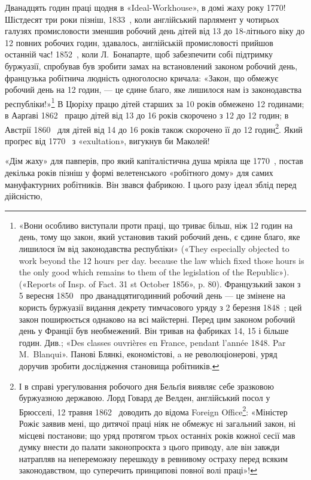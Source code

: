 Дванадцять годин праці щодня в «Ideal-Workhouse», в домі
жаху року 1770! Шістдесят три роки пізніш, 1833~, коли англійський
парлямент у чотирьох галузях промисловости зменшив
робочий день дітей від 13 до 18-літнього віку до 12 повних робочих
годин, здавалось, англійській промисловості прийшов останній
час! 1852~, коли Л.~Бонапарте, щоб забезпечити собі підтримку
буржуазії, спробував був зробити замах на встановлений
законом робочий день, французька робітнича людність одноголосно
кричала: «Закон, що обмежує робочий день на 12 годин, —
це єдине благо, яке лишилося нам із законодавства республіки!»\footnote{
«Вони особливо виступали проти праці, що триває більш, ніж
12 годин на день, тому що закон, який установив такий робочий день, є
єдине благо, яке лишилося їм від законодавства республіки» («They especially
objected to work beyond the 12 hours per day. because the law which
fixed those hours is the only good which remains to them of the legislation
of the Republic»). («Reports of Insp. of Fact. 31 st October 1856»,
p. 80). Французький закон з 5 вересня 1850~ про дванадцятигодинний
робочий день — це змінене на користь буржуазії видання декрету тимчасового
уряду з 2 березня 1848~; цей закон поширюється однаково на
всі майстерні. Перед цим законом робочий день у Франції був необмежений.
Він тривав на фабриках 14, 15 і більше годин. Див.; «Des classes
ouvrières en France, pendant l'année 1848. Par M.~Blanqui». Панові Блянкі,
економістові, a не революціонерові, уряд доручив зробити дослідження
становища робітників.
}
В Цюріху працю дітей старших за 10 років обмежено 12 годинами;
в Аарґаві 1862~ працю дітей від 13 до 16 років скорочено з 12
до 12 годин; в Австрії 1860~ для дітей від 14 до 16 років також
скорочено її до 12 годин\footnote{
І в справі урегулювання робочого дня Бельґія виявляє себе зразковою
буржуазною державою. Лорд Говард де Велден, англійський посол
у Брюсселі, 12 травня 1862~ доводить до відома Foreign Office\footnote*{
— англійського міністерства закордонних справ. \emph{Ред.}
}: «Міністер
Рожіє заявив мені, що дитячої праці ніяк не обмежує ні загальний закон,
ні місцеві постанови; що уряд протягом трьох останніх років кожної сесії
мав думку внести до палати законопроєкта з цього приводу, але він завжди
натрапляв на непереможну перешкоду в ревнивому остраху перед
всяким законодавством, що суперечить принципові повної волі праці»!
}. Який проґрес від 1770~ з «exultation», вигукнув би Маколей!

«Дім жаху» для павперів, про який капіталістична душа
мріяла ще 1770~, постав декілька років пізніш у формі велетенського
«робітного дому» для самих мануфактурних робітників.
Він звався фабрикою. І цього разу ідеал зблід перед дійсністю,

